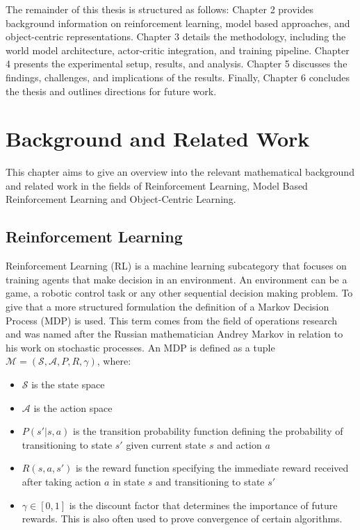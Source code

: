 \documentclass[
	english,
	ruledheaders=section,
	class=report,
	thesis={type=master},
	accentcolor=9c,
	custommargins=true,
	marginpar=false,
	parskip=half-,
	fontsize=11pt,
]{tudapub}
\begin{document}
The remainder of this thesis is structured as follows: Chapter 2 provides
background information on reinforcement learning, model based approaches, and
object-centric representations. Chapter 3 details the methodology, including
the world model architecture, actor-critic integration, and training pipeline.
Chapter 4 presents the experimental setup, results, and analysis. Chapter 5
discusses the findings, challenges, and implications of the results. Finally,
Chapter 6 concludes the thesis and outlines directions for future work.

\chapter{Background and Related Work}
\label{chap:background}
This chapter aims to give an overview into the relevant mathematical background and related work
in the fields of Reinforcement Learning, Model Based Reinforcement Learning and Object-Centric Learning.
\section{Reinforcement Learning}
\label{sec:reinforcement_learning}

Reinforcement Learning (RL) is a machine learning subcategory that focuses on
training agents that make decision in an environment. An environment can be a
game, a robotic control task or any other sequential decision making problem.
To give that a more structured formulation the definition of a Markov Decision
Process (MDP) is used. This term comes from the field of operations research
and was named after the Russian mathematician Andrey Markov in relation to his
work on stochastic processes. An MDP is defined as a tuple $\mathcal{M} =
	(\mathcal{S}, \mathcal{A}, P, R, \gamma)$, where:

\begin{itemize}
	\item $\mathcal{S}$ is the state space
	\item $\mathcal{A}$ is the action space
	\item $P(s'|s,a)$ is the transition probability function defining the probability of transitioning to state $s'$ given current state $s$ and action $a$
	\item $R(s,a,s')$ is the reward function specifying the immediate reward received after taking action $a$ in state $s$ and transitioning to state $s'$
	\item $\gamma \in [0,1]$ is the discount factor that determines the importance of future rewards. This is also often used to prove convergence of certain algorithms.
\end{itemize}
\end{document}
